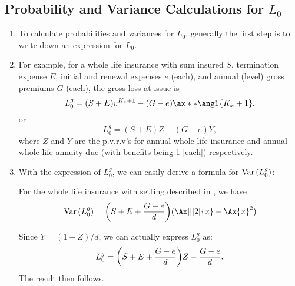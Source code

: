\subsection{Probability and Variance Calculations for \(L_0\)}
\begin{enumerate}
\item To calculate probabilities and variances for \(L_0\), generally the
first step is to write down an expression for \(L_0\).

\item \label{it:wl-gross-loss-expr}
For example, for a whole life insurance with sum insured
\(S\), termination expense \(E\), initial and renewal expenses \(e\) (each),
and annual (level) gross premiums \(G\) (each), the gross loss at issue is
\[
L_0^g=(S+E)v^{K_x+1}-(G-e)\ax**{\angl{K_x+1}},
\]
or
\[
L_0^g=(S+E)Z-(G-e)Y,
\]
where \(Z\) and \(Y\) are the p.v.r.v's for annual whole life insurance and
annual whole life annuity-due (with benefits being 1 [each]) respectively.

\item With the expression of \(L_0^g\), we can easily derive a formula for
\(\operatorname{Var}\qty(L_0^g)\): 
\begin{proposition}
\label{prp:wl-gross-loss-var-fmla}
For the whole life insurance with setting described in
, we have
\[
\vari{L_0^g}=\qty(S+E+\frac{G-e}{d})(\Ax[][2]{x}-\Ax{x}^2)
\]
\end{proposition}
\begin{pf}
Since \(Y=(1-Z)/d\), we can actually express \(L_0^g\) as:
\[
L_0^g=\qty(S+E+\frac{G-e}{d})Z-\frac{G-e}{d}.
\]
The result then follows.
\end{pf}


\end{enumerate}
